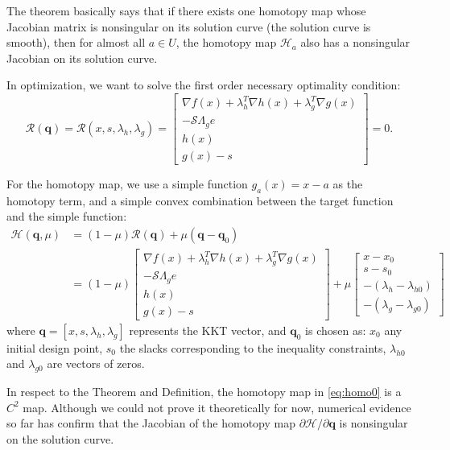 \documentclass{article}
\theoremstyle{definition}
\begin{document}
The theorem basically says that if there exists one homotopy map whose Jacobian matrix is nonsingular on its solution curve (the solution curve is smooth), then for almost all $a \in U$, the homotopy map $\mathcal{H}_a$ also has a nonsingular Jacobian on its solution curve.  

In optimization, we want to solve the first order necessary optimality condition: 
\begin{equation}
\mathcal{R}(\boldsymbol{q}) =\mathcal{R}(x,s,\lambda_h, \lambda_g) = \begin{bmatrix}
\nabla f(x)  + \lambda_h^T \nabla h(x)  + \lambda_g^T \nabla g(x)   \\
-\mathcal{S}\Lambda_g e\\
h(x) \\
g(x) - s 
\end{bmatrix} = 0.
\end{equation}

For the homotopy map, we use a simple function $g_a(x) = x - a$ as the homotopy term, and a simple convex combination between the target function and the simple function:
\begin{equation}\label{eq:homo0}
\begin{aligned}
\mathcal{H}(\boldsymbol{q}, \mu) &= (1-\mu) \mathcal{R}(\boldsymbol{q}) + \mu(\boldsymbol{q} - \boldsymbol{q}_0) \\ 
&= (1-\mu) \begin{bmatrix}
\nabla f(x)  + \lambda_h^T \nabla h(x)  + \lambda_g^T \nabla g(x)   \\
-\mathcal{S}\Lambda_g e \\
h(x) \\
g(x) - s 
\end{bmatrix}  + \mu 
\begin{bmatrix}
x-x_0 \\
s-s_0 \\
- (\lambda_h - \lambda_{h0} )  \\
- (\lambda_g - \lambda_{g0} ) 
\end{bmatrix}
\end{aligned}
\end{equation}
where $\boldsymbol{q} = [x, s, \lambda_{h}, \lambda_{g}]$ represents the KKT vector, and $\boldsymbol{q}_0$ is chosen as: $x_0$ any initial design point, $s_0$ the slacks corresponding to the inequality constraints, $\lambda_{h0}$ and $\lambda_{g0}$ are vectors of zeros.

In respect to the Theorem and Definition, the homotopy map in \eqref{eq:homo0} is a $C^2$ map. 
Although we could not prove it theoretically for now, numerical evidence so far has confirm that the Jacobian of the homotopy map  $\partial \mathcal{H}/\partial \boldsymbol{q}$ is nonsingular on the solution curve. 
\end{document}
